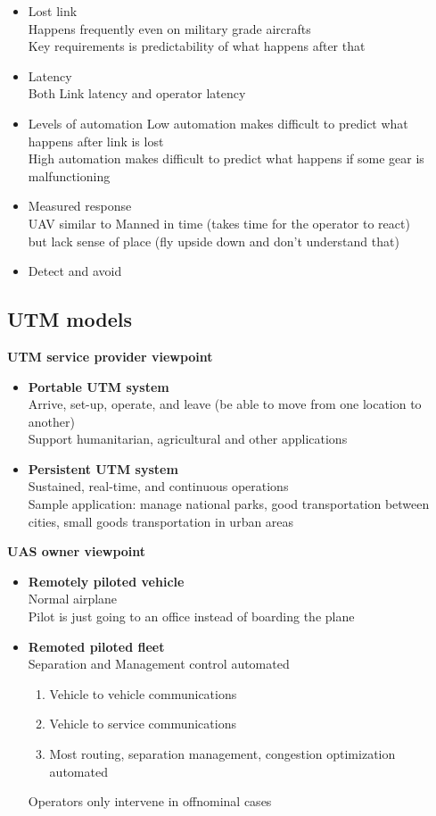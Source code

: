 \documentclass[10pt,a4paper]{book}
\begin{document}
\begin{itemize}
\item Lost link\\
Happens frequently even on military grade aircrafts\\
Key requirements is predictability of what happens after that
\item Latency\\
Both Link latency and operator latency
\item Levels of automation
Low automation makes difficult to predict what happens after link is lost\\
High automation makes difficult to predict what happens if some gear is
malfunctioning
\item Measured response\\
UAV similar to Manned in time (takes time for the operator to react)\\
but lack sense of place (fly upside down and don't understand that)
\item Detect and avoid
\end{itemize}
\subsection{UTM models}
\textbf{UTM service provider viewpoint}\\
\begin{itemize}
\item \textbf{Portable UTM system}\\
Arrive, set-up, operate, and leave (be able to move from one location to another)\\
Support humanitarian, agricultural and other applications
\item \textbf{Persistent UTM system}\\
Sustained, real-time, and continuous operations\\
Sample application: manage national parks, good transportation between cities, small goods transportation in
urban areas
\end{itemize}
\textbf{UAS owner viewpoint}
\begin{itemize}
\item \textbf{Remotely piloted vehicle}\\
Normal airplane\\
Pilot is just going to an office instead of boarding the plane
\item \textbf{Remoted piloted fleet}\\
Separation and Management control automated
\begin{enumerate}
\item Vehicle to vehicle communications
\item Vehicle to service communications
\item Most routing, separation management, congestion optimization automated
\end{enumerate}
Operators only intervene in offnominal cases
\end{itemize}
\end{document}
